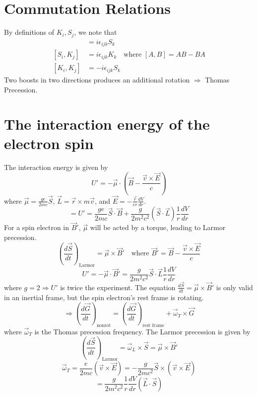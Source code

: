 \documentclass{article}
\begin{document}
	\section*{Commutation Relations}
	
	By definitions of $K_i, S_j$, we note that
	\begin{align*}
		[S_i, S_j] &= i\epsilon_{ijk} S_k \\
		[S_i, K_j] &= i\epsilon_{ijk} K_k \quad \text{where } [A, B] = AB - BA \\
		[K_i, K_j] &= -i\epsilon_{ijk} S_k
	\end{align*}
	Two boosts in two directions produces an additional rotation $\Rightarrow$ Thomas Precession.
	
	\section{The interaction energy of the electron spin}
	The interaction energy is given by
	\[ U' = -\vec{\mu} \cdot \left( \vec{B} - \frac{\vec{v} \times \vec{E}}{c} \right) \]
	where $\vec{\mu} = \frac{g e}{2mc}\vec{S}$, $\vec{L} = \vec{r} \times m\vec{v}$, and $\vec{E} = -\frac{\vec{r}}{er} \frac{dV}{dr}$.
	\[ = U' = \frac{g e}{2mc} \vec{S} \cdot \vec{B} + \frac{g}{2m^2c^2} (\vec{S} \cdot \vec{L}) \frac{1}{r} \frac{dV}{dr} \]
	For a spin electron in $\vec{B}'$, $\vec{\mu}$ will be acted by a torque, leading to Larmor precession.
	\[ \left( \frac{d\vec{S}}{dt} \right)_{\text{Larmor}} = \vec{\mu} \times \vec{B}' \quad \text{where } \vec{B}' = \vec{B} - \frac{\vec{v} \times \vec{E}}{c} \]
	\[ U' = -\vec{\mu} \cdot \vec{B}' = \frac{g}{2m^2c^2} \vec{S} \cdot \vec{L} \frac{1}{r} \frac{dV}{dr} \]
	where $g=2 \Rightarrow U'$ is twice the experiment.
	The equation $\frac{d\vec{S}}{dt} = \vec{\mu} \times \vec{B}'$ is only valid in an inertial frame, but the spin electron's rest frame is rotating.
	\[ \Rightarrow \left( \frac{d\vec{G}}{dt} \right)_{\text{nonrot}} = \left( \frac{d\vec{G}}{dt} \right)_{\text{rest frame}} + \vec{\omega}_T \times \vec{G} \]
	where $\vec{\omega}_T$ is the Thomas precession frequency.
	The Larmor precession is given by
	\[ \left( \frac{d\vec{S}}{dt} \right)_{\text{Larmor}} = \vec{\omega}_L \times \vec{S} = \vec{\mu} \times \vec{B}' \]
	\[ \vec{\omega}_T = \frac{e}{2mc} (\vec{v} \times \vec{E}) = -\frac{g}{2mc^2} \vec{S} \times (\vec{v} \times \vec{E}) \]
	\[ = \frac{g}{2m^2c^2} \frac{1}{r} \frac{dV}{dr} (\vec{L} \cdot \vec{S}) \]
	
\end{document}
